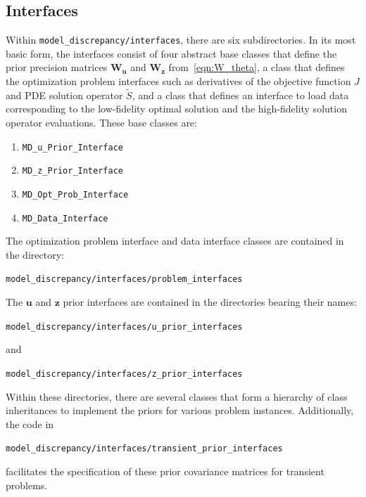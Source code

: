 \documentclass[11pt]{article}
\renewcommand{\u}{\bm{u}}
\newcommand{\z}{\bm{z}}
\newcommand{\0}{\bm{0}}
\newcommand{\W}{\bm{W}}
\begin{document}
\subsection*{Interfaces}
Within \texttt{model\_discrepancy/interfaces}, there are six subdirectories. In its most basic form, the interfaces consist of four abstract base classes that define the prior precision matrices $\W_{\u}$ and $\W_{\z}$ from~\eqref{eqn:W_theta}, a class that defines the optimization problem interfaces such as derivatives of the objective function $J$ and PDE solution operator $\tilde{S}$, and a class that defines an interface to load data corresponding to the low-fidelity optimal solution and the high-fidelity solution operator evaluations. These base classes are:
\begin{enumerate}
\item[] \texttt{MD\_u\_Prior\_Interface}
\item[] \texttt{MD\_z\_Prior\_Interface}
\item[] \texttt{MD\_Opt\_Prob\_Interface}
\item[] \texttt{MD\_Data\_Interface}
\end{enumerate}

The optimization problem interface and data interface classes are contained in the directory: 

\begin{center}\texttt{model\_discrepancy/interfaces/problem\_interfaces}\end{center}

The $\u$ and $\z$ prior interfaces are contained in the directories bearing their names: 

\begin{center}\texttt{model\_discrepancy/interfaces/u\_prior\_interfaces}\end{center}

 and 

\begin{center}\texttt{model\_discrepancy/interfaces/z\_prior\_interfaces}\end{center}

Within these directories, there are several classes that form a hierarchy of class inheritances to implement the priors for various problem instances. Additionally, the code in 

\begin{center}\texttt{model\_discrepancy/interfaces/transient\_prior\_interfaces}\end{center}

 facilitates the specification of these prior covariance matrices for transient problems.
\end{document}
